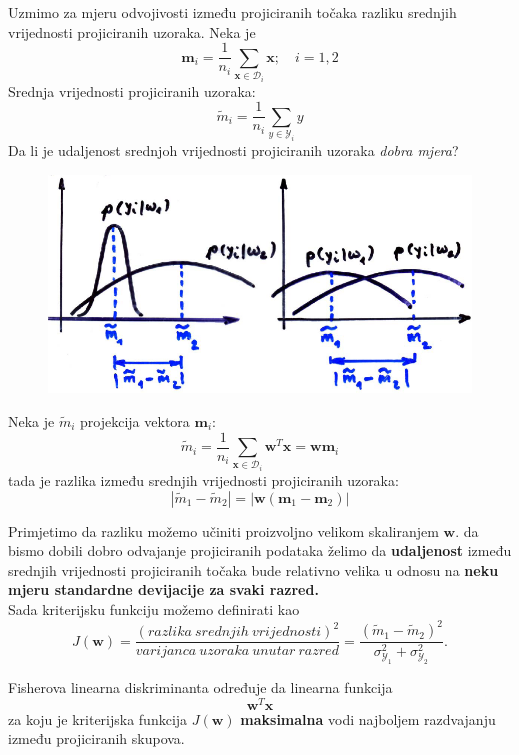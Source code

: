 \documentclass{book}
\begin{document}
Uzmimo za mjeru odvojivosti između projiciranih točaka razliku srednjih
vrijednosti projiciranih uzoraka. Neka je
$$ \mathbf{m}_i = \frac{1}{n_i}\sum\limits_{\mathbf{x} \in
\mathcal{D}_i}\mathbf{x}; \quad i=1,2$$
Srednja vrijednosti projiciranih uzoraka: 
$$ \widetilde{m}_i = \frac{1}{n_i}\sum\limits_{y \in
\mathcal{Y}_i}y $$
Da li je udaljenost srednjoh vrijednosti projiciranih uzoraka \textit{dobra
mjera}?

\begin{figure}[H]
\begin{center}
\includegraphics[scale=.5]{./pics/fisher_dobramjeraupitnik}
\end{center}
\end{figure} 

Neka je $\widetilde{m}_i$ projekcija vektora $\mathbf{m}_i$:
$$ \widetilde{m}_i = \frac{1}{n_i}\sum\limits_{\mathbf{x} \in
\mathcal{D}_i}\mathbf{w}^T\mathbf{x} = \mathbf{w}\mathbf{m}_i $$
tada je razlika između srednjih vrijednosti projiciranih uzoraka:
$$ | \widetilde{m}_1 - \widetilde{m}_2 | = | \mathbf{w}(\mathbf{m}_1 -
\mathbf{m}_2) | $$

Primjetimo da razliku možemo učiniti proizvoljno velikom skaliranjem
$\mathbf{w}$. da bismo dobili dobro odvajanje projiciranih podataka želimo da
\textbf{udaljenost} između srednjih vrijednosti projiciranih točaka bude
relativno velika u odnosu na \textbf{neku mjeru standardne devijacije za svaki
razred.} \\

Sada kriterijsku funkciju možemo definirati kao
$$ J(\mathbf{w}) = \frac{(razlika \ srednjih \ vrijednosti)^2}{varijanca \
uzoraka \ unutar \ razred} = \frac{ (\widetilde{m}_1 - \widetilde{m}_2 )^2
}{\sigma_{\mathcal{Y}_1}^2 + \sigma_{\mathcal{Y}_2}^2}. $$

Fisherova linearna diskriminanta određuje da linearna funkcija
$$\mathbf{w}^T\mathbf{x} $$ za koju je kriterijska funkcija $J(\mathbf{w})$
\textbf{maksimalna} vodi najboljem razdvajanju između projiciranih skupova. \\
\end{document}
